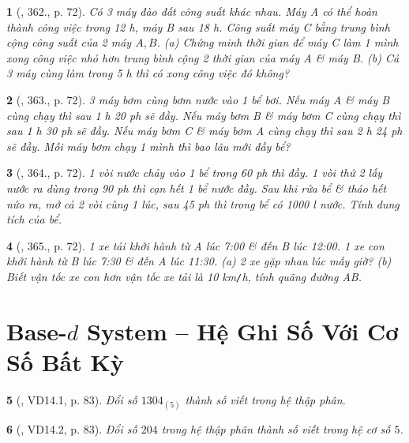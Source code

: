 \documentclass{article}
\newtheorem{baitoan}{}
\begin{document}
\begin{baitoan}[\cite{Tuyen_Toan_6}, 362., p. 72]
	Có 3 máy đào đất công suất khác nhau. Máy A có thể hoàn thành công việc trong {\rm12 h}, máy B sau {\rm18 h}. Công suất máy C bằng trung bình cộng công suất của 2 máy $A,B$. (a) Chứng minh thời gian để máy C làm 1 mình xong công việc nhỏ hơn trung bình cộng 2 thời gian của máy A \& máy B. (b) Cả 3 máy cùng làm trong {\rm5 h} thì có xong công việc đó không?
\end{baitoan}

\begin{baitoan}[\cite{Tuyen_Toan_6}, 363., p. 72]
	3 máy bơm cùng bơm nước vào 1 bể bơi. Nếu máy A \& máy B cùng chạy thì sau {\rm1 h 20 ph} sẽ đầy. Nếu máy bơm B \& máy bơm C cùng chạy thì sau {\rm1 h 30 ph} sẽ đầy. Nếu máy bơm C \& máy bơm A cùng chạy thì sau {\rm2 h 24 ph} sẽ đầy. Mỗi máy bơm chạy 1 mình thì bao lâu mới đầy bể?
\end{baitoan}

\begin{baitoan}[\cite{Tuyen_Toan_6}, 364., p. 72]
	1 vòi nước chảy vào 1 bể trong {\rm60 ph} thì đầy. 1 vòi thứ 2 lấy nước ra dùng trong {\rm90 ph} thì cạn hết 1 bể nước đầy. Sau khi rửa bể \& tháo hết nứo ra, mở cả 2 vòi cùng 1 lúc, sau {\rm45 ph} thì trong bể có {\rm1000 l} nước. Tính dung tích của bể.
\end{baitoan}

\begin{baitoan}[\cite{Tuyen_Toan_6}, 365., p. 72]
	1 xe tải khởi hành từ A lúc {\rm7:00} \& đến B lúc {\rm12:00}. 1 xe con khởi hành từ B lúc {\rm7:30} \& đến A lúc {\rm11:30}. (a) 2 xe gặp nhau lúc mấy giờ? (b) Biết vận tốc xe con hơn vận tốc xe tải là {\rm10 km{\tt/}h}, tính quãng đường AB.
\end{baitoan}


\section{Base-$d$ System -- Hệ Ghi Số Với Cơ Số Bất Kỳ}

\begin{baitoan}[\cite{TLCT_THCS_Toan_6_so_hoc}, VD14.1, p. 83]
	Đổi số $1304_{(5)}$ thành số viết trong hệ thập phân.
\end{baitoan}

\begin{baitoan}[\cite{TLCT_THCS_Toan_6_so_hoc}, VD14.2, p. 83]
	Đổi số $204$ trong hệ thập phân thành số viết trong hệ cơ số $5$.
\end{baitoan}
\end{document}
